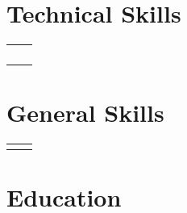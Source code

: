 \documentclass{article}
\begin{document}
\setlength{\parskip}{0pt}
\maketitle




\section{Technical Skills}
    \begin{flushleft}
        \begin{tabular}{>{\raggedleft\arraybackslash}p{1.25in} >{\raggedright\arraybackslash}p{5.85in}}
             \\
             \\
             \\
             \\
             \\
        \end{tabular}
    \end{flushleft}



\section{General Skills}

    \begin{flushleft}
        \begin{tabular}{>{\raggedleft\arraybackslash}p{1.25in} >{\raggedright\arraybackslash}p{5.85in}}
             \\
             \\
            
        \end{tabular}
    \end{flushleft}



\section{Education}
\end{document}
